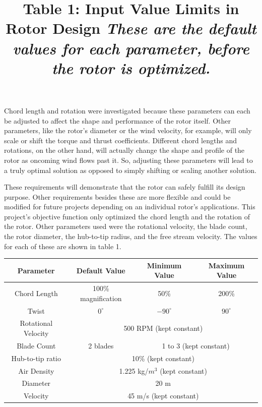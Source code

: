 \documentclass{article}
\begin{document}
\noindent Chord length and rotation were investigated because these parameters can each be adjusted to affect the shape and performance of the rotor itself. Other parameters, like the rotor's diameter or the wind velocity, for example, will only scale or shift the torque and thrust coefficients. Different chord lengths and rotations, on the other hand, will actually change the shape and profile of the rotor as oncoming wind flows past it. So, adjusting these parameters will lead to a truly optimal solution as opposed to simply shifting or scaling another solution. \newline

\noindent These requirements will demonstrate that the rotor can safely fulfill its design purpose. Other requirements besides these are more flexible and could be modified for future projects depending on an individual rotor's applications. This project's objective function only optimized the chord length and the rotation of the rotor. Other parameters used were the rotational velocity, the blade count, the rotor diameter, the hub-to-tip radius, and the free stream velocity. The values for each of these are shown in table 1. \newline

\centering
\title{Table 1: Input Value Limits in Rotor Design \newline}
\title{\emph{These are the default values for each parameter, before the rotor is optimized.}} \label{table:1} \newline
\begin{tabular}{| c | c | c | c |}
	 \hline
  	 \textbf{Parameter} & \textbf{Default Value} & \textbf{Minimum Value} & \textbf{Maximum Value} \\ \hline
	 Chord Length & 100\% magnification & 50\% & 200\% \\ \hline
	 Twist & $0^{\circ}$ & $-90^{\circ}$ & $90^{\circ}$ \\ \hline
	 Rotational Velocity & \multicolumn{3}{c|}{500 RPM (kept constant)} \\ \hline
	 Blade Count & 2 blades & \multicolumn{2}{c|}{1 to 3 (kept constant)}\\ \hline
	 Hub-to-tip ratio & \multicolumn{3}{c|}{10\% (kept constant)} \\ \hline
	 Air Density & \multicolumn{3}{c|}{1.225 kg/$m^{3}$ (kept constant)} \\ \hline
	 Diameter & \multicolumn{3}{c|}{20 m} \\ \hline
	 Velocity & \multicolumn{3}{c|}{45 m/s (kept constant)} \\ \hline
\end{tabular} \break \newline
\end{document}
